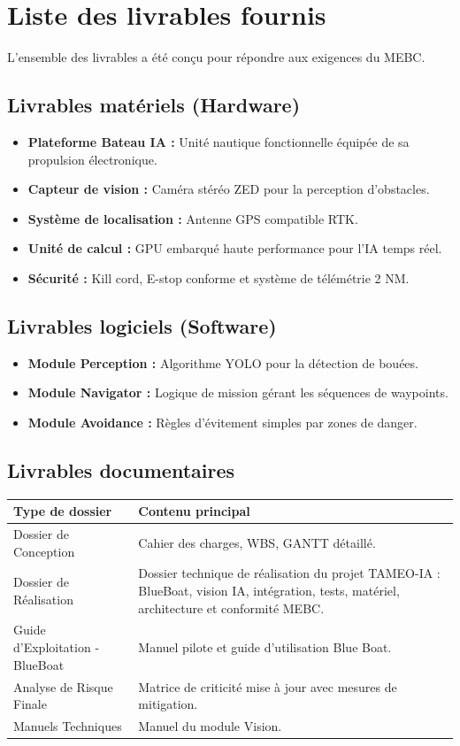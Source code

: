 \documentclass[11pt,letterpaper]{article}
\begin{document}
\section{Liste des livrables fournis}
L'ensemble des livrables a été conçu pour répondre aux exigences du MEBC.

\subsection{Livrables matériels (Hardware)}
\begin{itemize}
    \item \textbf{Plateforme Bateau IA :} Unité nautique fonctionnelle équipée de sa propulsion électronique.
    \item \textbf{Capteur de vision :} Caméra stéréo ZED pour la perception d'obstacles.
    \item \textbf{Système de localisation :} Antenne GPS compatible RTK.
    \item \textbf{Unité de calcul :} GPU embarqué haute performance pour l'IA temps réel.
    \item \textbf{Sécurité :} Kill cord, E-stop conforme et système de télémétrie 2 NM.
\end{itemize}

\subsection{Livrables logiciels (Software)}
\begin{itemize}
    \item \textbf{Module Perception :} Algorithme YOLO pour la détection de bouées.
    \item \textbf{Module Navigator :} Logique de mission gérant les séquences de waypoints.
    \item \textbf{Module Avoidance :} Règles d'évitement simples par zones de danger.
\end{itemize}

\subsection{Livrables documentaires}
\begin{tabularx}{\textwidth}{lX}
\toprule
\textbf{Type de dossier} & \textbf{Contenu principal} \\
\midrule
Dossier de Conception & Cahier des charges, WBS, GANTT détaillé. \\
Dossier de Réalisation & Dossier technique de réalisation du projet TAMEO-IA : BlueBoat, vision IA, intégration, tests, matériel, architecture et conformité MEBC. \\
Guide d'Exploitation - BlueBoat & Manuel pilote et guide d'utilisation Blue Boat. \\
Analyse de Risque Finale & Matrice de criticité mise à jour avec mesures de mitigation. \\
Manuels Techniques & Manuel du module Vision. \\
\bottomrule
\end{tabularx}
\end{document}
